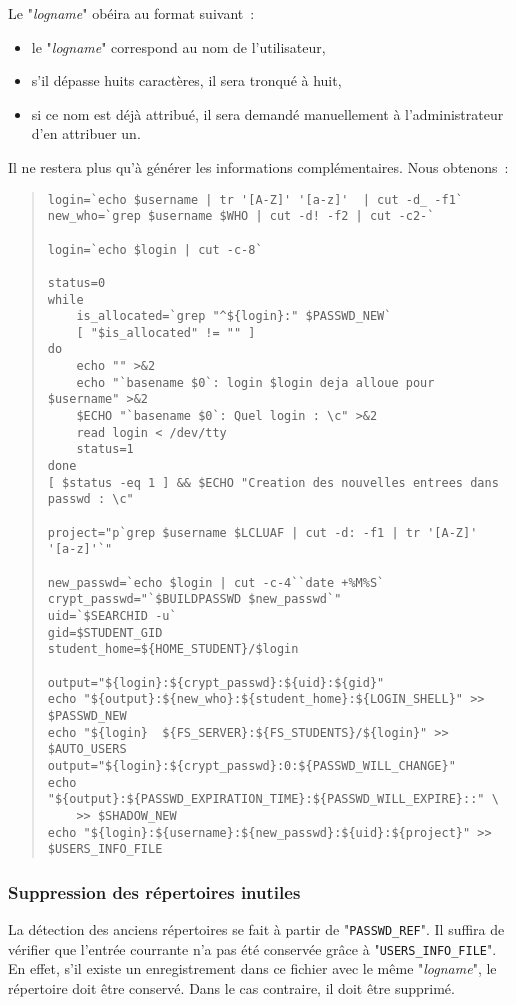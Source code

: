 Le "{\sl logname}" {\Unix} ob{\'e}ira au format suivant~:
\begin{itemize}
	\item	le "{\sl logname}" correspond au nom de l'utilisateur,
	\item	s'il d{\'e}passe huits caract{\`e}res, il sera tronqu{\'e} {\`a} huit,
	\item	si ce nom est d{\'e}j{\`a} attribu{\'e}, il sera demand{\'e} manuellement {\`a} l'administrateur
			d'en attribuer un.
\end{itemize}
Il ne restera plus qu'{\`a} g{\'e}n{\'e}rer les informations compl{\'e}mentaires. Nous obtenons~:
\begin{quote}
\begin{verbatim}
login=`echo $username | tr '[A-Z]' '[a-z]'  | cut -d_ -f1`
new_who=`grep $username $WHO | cut -d! -f2 | cut -c2-`

login=`echo $login | cut -c-8`

status=0
while
    is_allocated=`grep "^${login}:" $PASSWD_NEW`
    [ "$is_allocated" != "" ]
do
    echo "" >&2
    echo "`basename $0`: login $login deja alloue pour $username" >&2
    $ECHO "`basename $0`: Quel login : \c" >&2
    read login < /dev/tty
    status=1
done
[ $status -eq 1 ] && $ECHO "Creation des nouvelles entrees dans passwd : \c"

project="p`grep $username $LCLUAF | cut -d: -f1 | tr '[A-Z]' '[a-z]'`"

new_passwd=`echo $login | cut -c-4``date +%M%S`
crypt_passwd="`$BUILDPASSWD $new_passwd`"
uid=`$SEARCHID -u`
gid=$STUDENT_GID
student_home=${HOME_STUDENT}/$login

output="${login}:${crypt_passwd}:${uid}:${gid}"
echo "${output}:${new_who}:${student_home}:${LOGIN_SHELL}" >> $PASSWD_NEW
echo "${login}  ${FS_SERVER}:${FS_STUDENTS}/${login}" >> $AUTO_USERS
output="${login}:${crypt_passwd}:0:${PASSWD_WILL_CHANGE}"
echo "${output}:${PASSWD_EXPIRATION_TIME}:${PASSWD_WILL_EXPIRE}::" \
    >> $SHADOW_NEW
echo "${login}:${username}:${new_passwd}:${uid}:${project}" >> $USERS_INFO_FILE
\end{verbatim}
\end{quote}

\subsubsection{\label{adv-programming-ex3-devlrm}Suppression des r{\'e}pertoires inutiles}

La d{\'e}tection des anciens r{\'e}pertoires se fait {\`a} partir de "{\tt PASSWD\_REF}". Il
suffira de v{\'e}rifier que l'entr{\'e}e courrante n'a pas {\'e}t{\'e} conserv{\'e}e gr{\^a}ce {\`a}
"{\tt USERS\_INFO\_FILE}". En effet, s'il existe un enregistrement dans ce
fichier avec le m{\^e}me "{\sl logname}", le r{\'e}pertoire doit {\^e}tre conserv{\'e}. Dans
le cas contraire, il doit {\^e}tre supprim{\'e}.

